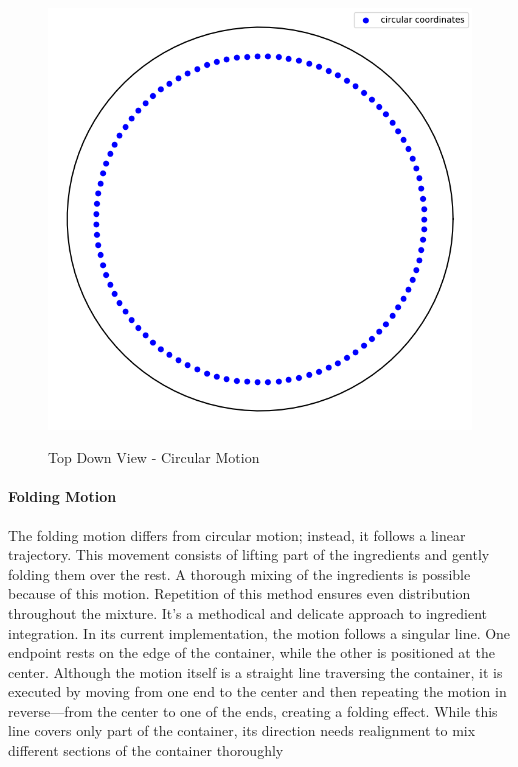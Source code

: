 \begin{figure}[H]
    \includegraphics[scale=0.35]{Graphics/motions/circular_motion.png}
    \centering
    \label{fig:circularMotion}
    \caption{Top Down View - Circular Motion}
\end{figure}

\paragraph{Folding Motion}
The folding motion differs from circular motion; instead, it follows a linear trajectory.
This movement consists of lifting part of the ingredients and gently folding them over the rest.
A thorough mixing of the ingredients is possible because of this motion. Repetition of this method ensures even distribution throughout the mixture. 
It's a methodical and delicate approach to ingredient integration.
\newline
\newline
In its current implementation, the motion follows a singular line. One endpoint rests on the edge of the container, while the other is positioned at the center.
Although the motion itself is a straight line traversing the container, it is executed by moving from one end to the center and then repeating 
the motion in reverse—from the center to one of the ends, creating a folding effect.
While this line covers only part of the container, its direction needs realignment to mix different sections of the container thoroughly


